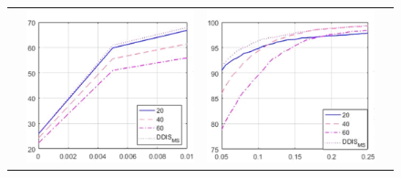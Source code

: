 \documentclass[10pt,twocolumn,letterpaper]{article}
\begin{document}
{\begin{figure}[htb]
	\centering
	\setlength\tabcolsep{0.5pt}
	\begin{tabular}{cccc}
		\rotatebox{90}{    \, \% Correspondences} &
		\includegraphics[scale=0.5]{figures/PieceSizeLow.png} &  
		\includegraphics[scale=0.5]{figures/PieceSizeMedium.png}&

\end{tabular}
\end{figure}}
\end{document}
